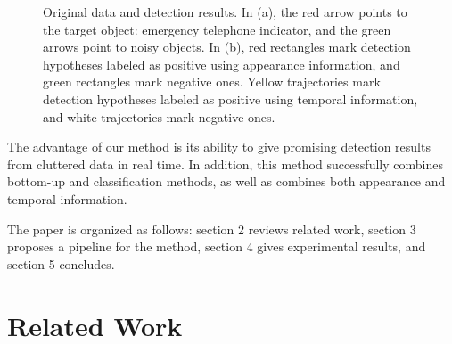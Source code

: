 \documentclass{JoITSRstyle}
\begin{document}
\begin{figure}
\centering
{}
\caption{Original data and detection results. In (a), the red arrow points to the target object: emergency telephone indicator, and the green arrows point to noisy objects. In (b), red rectangles mark detection hypotheses labeled as positive using appearance information, and green rectangles mark negative ones. Yellow trajectories mark detection hypotheses labeled as positive using temporal information, and white trajectories mark negative ones.}
\label{fig:first}
\end{figure}







The advantage of our method is its ability to give promising detection results from cluttered data in real time. In addition, this method successfully  combines bottom-up and classification methods, as well as combines both appearance and temporal information.

The paper is organized as follows: section 2 reviews related work, section 3 proposes a pipeline for the method, section 4 gives experimental results, and section 5 concludes.

\section{Related Work}
\end{document}
